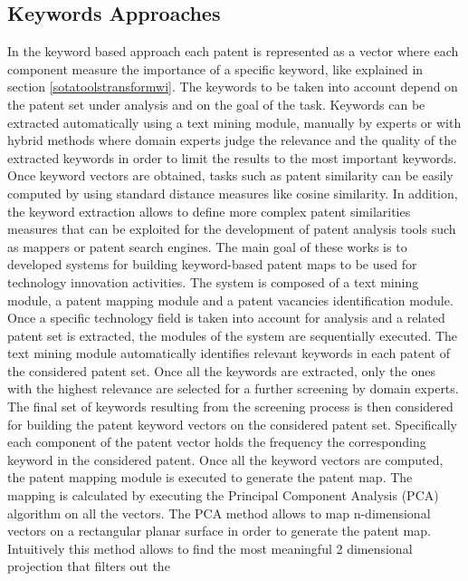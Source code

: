 \documentclass[]{book}
\begin{document}
\subsection{Keywords Approaches}\label{keywords-approaches}

In the keyword based approach each patent is represented as a vector
where each component measure the importance of a specific keyword, like
explained in section \ref{sotatoolstransformwi}. The keywords to be
taken into account depend on the patent set under analysis and on the
goal of the task. Keywords can be extracted automatically using a text
mining module, manually by experts or with hybrid methods where domain
experts judge the relevance and the quality of the extracted keywords in
order to limit the results to the most important keywords. Once keyword
vectors are obtained, tasks such as patent similarity can be easily
computed by using standard distance measures like cosine similarity. In
addition, the keyword extraction allows to define more complex patent
similarities measures \citep{moehrle2010measures} that can be exploited
for the development of patent analysis tools
\citep{lee2009approach, lee2015novelty} such as mappers or patent search
engines. The main goal of these works is to developed systems for
building keyword-based patent maps to be used for technology innovation
activities. The system is composed of a text mining module, a patent
mapping module and a patent vacancies identification module. Once a
specific technology field is taken into account for analysis and a
related patent set is extracted, the modules of the system are
sequentially executed. The text mining module automatically identifies
relevant keywords in each patent of the considered patent set. Once all
the keywords are extracted, only the ones with the highest relevance are
selected for a further screening by domain experts. The final set of
keywords resulting from the screening process is then considered for
building the patent keyword vectors on the considered patent set.
Specifically each component of the patent vector holds the frequency the
corresponding keyword in the considered patent. Once all the keyword
vectors are computed, the patent mapping module is executed to generate
the patent map. The mapping is calculated by executing the Principal
Component Analysis (PCA) algorithm on all the vectors. The PCA method
allows to map n-dimensional vectors on a rectangular planar surface in
order to generate the patent map. Intuitively this method allows to find
the most meaningful 2 dimensional projection that filters out the
\end{document}
